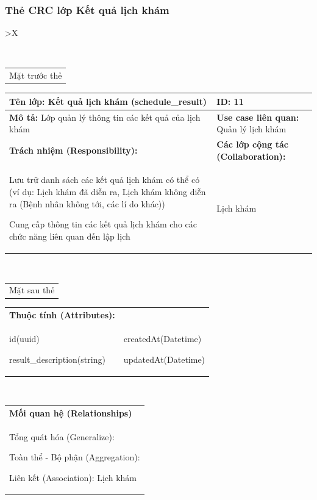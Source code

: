 \cleardoublepage

\subsubsection{Thẻ CRC lớp Kết quả lịch khám}

\begin{xltabular}{\textwidth}{
		>{\centering\arraybackslash}X
	}
	\caption{\bfseries \fontsize{12pt}{0pt}\selectfont Thẻ CRC lớp Kết quả lịch khám}
	\\
	\begin{tabularx}{0.9\textwidth}{X}
		Mặt trước thẻ
	\end{tabularx}
	\begin{tabularx}{0.9\textwidth}{|X|X|}
		\hline
		\textbf{Tên lớp:} Kết quả lịch khám (schedule\_result)          & \textbf{ID:} 11                                 \\
		\hline
		\textbf{Mô tả:} Lớp quản lý thông tin các kết quả của lịch khám & \textbf{Use case liên quan:}  Quản lý lịch khám \\
		\hline
		\textbf{Trách nhiệm (Responsibility):}                          & \textbf{Các lớp cộng tác (Collaboration):}      \\
		Lưu trữ danh sách các kết quả lịch khám có thể có (ví dụ: Lịch khám đã diễn ra, Lịch khám không diễn ra (Bệnh nhân không tới, các lí do khác))

		Cung cấp thông tin các kết quả lịch khám cho các chức năng liên quan đến lập lịch
		                                                                &
		Lịch khám
		\\
		\hline
	\end{tabularx}
	\\
	\begin{tabularx}{0.9\textwidth}{X}
		Mặt sau thẻ
	\end{tabularx}
	\begin{tabularx}{0.9\textwidth}{|X|X|}
		\hline
		\textbf{Thuộc tính (Attributes):} & \\
		id(uuid)

		result\_description(string)
		                                  &
		createdAt(Datetime)

		updatedAt(Datetime)
		\\ \hline
	\end{tabularx}
	\\
	\begin{tabularx}{0.9\textwidth}{|X|}
		\hline
		\textbf{Mối quan hệ (Relationships)} \\
		Tổng quát hóa (Generalize):

		Toàn thể - Bộ phận (Aggregation):

		Liên kết (Association): Lịch khám
		\\
		\hline
	\end{tabularx}
\end{xltabular}

